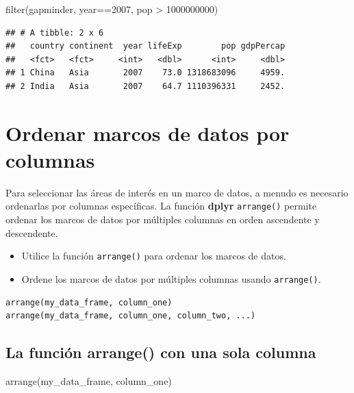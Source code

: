 \documentclass[
]{book}
\newenvironment{Shaded}{\begin{snugshade}}{\end{snugshade}}
\newcommand{\DecValTok}[1]{\textcolor[rgb]{0.00,0.00,0.81}{#1}}
\newcommand{\FunctionTok}[1]{\textcolor[rgb]{0.00,0.00,0.00}{#1}}
\newcommand{\NormalTok}[1]{#1}
\newcommand{\SpecialCharTok}[1]{\textcolor[rgb]{0.00,0.00,0.00}{#1}}
\providecommand{\tightlist}{%
  \setlength{\itemsep}{0pt}\setlength{\parskip}{0pt}}
\begin{document}
\begin{Shaded}
\begin{Highlighting}[]
\FunctionTok{filter}\NormalTok{(gapminder, year}\SpecialCharTok{==}\DecValTok{2007}\NormalTok{, pop }\SpecialCharTok{\textgreater{}} \DecValTok{1000000000}\NormalTok{)}
\end{Highlighting}
\end{Shaded}

\begin{verbatim}
## # A tibble: 2 x 6
##   country continent  year lifeExp        pop gdpPercap
##   <fct>   <fct>     <int>   <dbl>      <int>     <dbl>
## 1 China   Asia       2007    73.0 1318683096     4959.
## 2 India   Asia       2007    64.7 1110396331     2452.
\end{verbatim}

\hypertarget{ordenar-marcos-de-datos-por-columnas}{%
\section{Ordenar marcos de datos por columnas}\label{ordenar-marcos-de-datos-por-columnas}}

Para seleccionar las áreas de interés en un marco de datos, a menudo es necesario ordenarlas por columnas específicas. La función \textbf{dplyr} \texttt{arrange()} permite ordenar los marcos de datos por múltiples columnas en orden ascendente y descendente.

\begin{itemize}
\tightlist
\item
  Utilice la función \texttt{arrange()} para ordenar los marcos de datos.
\item
  Ordene los marcos de datos por múltiples columnas usando \texttt{arrange()}.
\end{itemize}

\begin{verbatim}
arrange(my_data_frame, column_one)
arrange(my_data_frame, column_one, column_two, ...)
\end{verbatim}

\hypertarget{la-funciuxf3n-arrange-con-una-sola-columna}{%
\subsection{La función arrange() con una sola columna}\label{la-funciuxf3n-arrange-con-una-sola-columna}}

\begin{Shaded}
\begin{Highlighting}[]
\FunctionTok{arrange}\NormalTok{(my\_data\_frame, column\_one)}
\end{Highlighting}
\end{Shaded}
\end{document}
